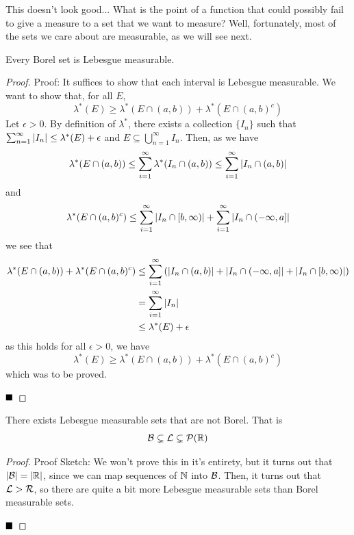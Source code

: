 This doesn't look good... What is the point of a function that could possibly fail to give a measure to a set that we want to measure? Well, fortunately, most of the sets we care about are measurable, as we will see next.

\begin{lemma}
    Every Borel set is Lebesgue measurable.
\end{lemma}
\begin{proof}{Proof:}
    It suffices to show that each interval is Lebesgue measurable. We want to show that, for all $E$, 
    \[ \lambda^{*}(E) \geq \lambda^{*}(E \cap (a, b)) + \lambda^{*}(E \cap (a, b)^{c}) \]
    Let $\epsilon > 0$. By definition of $\lambda^{*}$, there exists a collection $\{I_n\}$ such that $\sum_{n = 1}^{\infty} \abs{I_n} \leq \lambda^*(E) + \epsilon$ and $E \subseteq \bigcup_{n = 1}^{\infty} I_n$. Then, as we have
    \[ \lambda^{*}(E \cap (a, b)) \leq \sum_{i = 1}^{\infty} \lambda^{*}(I_n \cap (a, b)) \leq \sum_{i = 1}^{\infty} \abs{I_n \cap (a, b)} \]
    and
    \[ \lambda^{*}(E \cap (a, b)^{c}) \leq \sum_{i = 1}^{\infty} \abs{I_n \cap [b, \infty)} + \sum_{i = 1}^{\infty} \abs{I_n \cap (-\infty, a]} \]
    we see that
    \begin{align*} 
        \lambda^{*}(E \cap (a, b)) + \lambda^{*}(E \cap (a, b)^{c}) &\leq \sum_{i = 1}^{\infty} \left(\abs{I_n \cap (a, b)} + \abs{I_n \cap (-\infty, a]} + \abs{I_n \cap [b, \infty)}\right)\\
        &= \sum_{i = 1}^{\infty} \abs{I_n}\\
        &\leq \lambda^{*}(E) + \epsilon
    \end{align*}
    as this holds for all $\epsilon > 0$, we have
    \[ \lambda^{*}(E) \geq \lambda^{*}(E \cap (a, b)) + \lambda^{*}(E \cap (a, b)^{c}) \]
    which was to be proved.

    $\qed$
\end{proof}

\begin{lemma}
    There exists Lebesgue measurable sets that are not Borel. That is
    \[ \cal{B} \subsetneq \cal{L} \subsetneq \P(\R) \]
\end{lemma}
\begin{proof}{Proof Sketch:}
    We won't prove this in it's entirety, but it turns out that $\abs{\cal{B}} = \abs{\R}$, since we can map sequences of $\N$ into $\cal{B}$. Then, it turns out that $\cal{L} > \cal{R}$, so there are quite a bit more Lebesgue measurable sets than Borel measurable sets. 

    $\qed$
\end{proof}